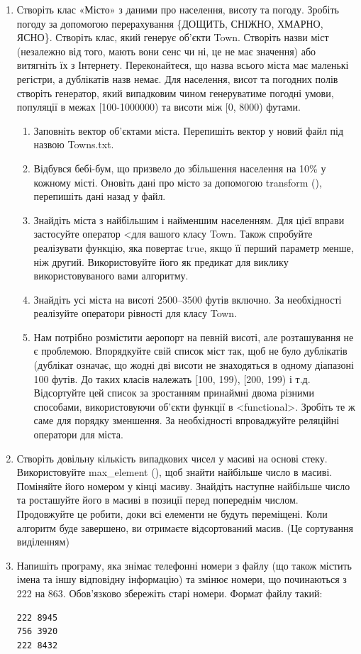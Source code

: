 \documentclass[a5paper,titlepage,openany,twoside,draft]{book_unv}%
\makeatletter
\newcommand{\xslalph}[1]{\expandafter\@xslalph\csname c@#1\endcsname}
\newcommand{\@xslalph}[1]{%
    \ifcase#1\or а\or б\or в\or г\or д\or e\or є\or ж\or з\or i%
    \or й\or к\or л\or м\or н\or о\or п\or р\or с\or т%
    \or у\or ф\or х\or ц\or ч\or ш\or ю\or я\or аа\or бб\or вв%
    \else\@ctrerr\fi%
}
\makeatother
\begin{document}
\begin{enumerate}
\item
  Створіть клас «Місто» з даними про населення, висоту та погоду.
  Зробіть погоду за допомогою перерахування \{ДОЩИТЬ, СНІЖНО, ХМАРНО,
  ЯСНО\}. Створіть клас, який генерує об'єкти Town. Створіть назви міст
  (незалежно від того, мають вони сенс чи ні, це не має значення) або
  витягніть їх з Інтернету. Переконайтеся, що назва всього міста має
  маленькі регістри, а дублікатів назв немає. Для населення, висот та погодних
  полів створіть генератор, який випадковим чином генеруватиме погодні
  умови, популяції в межах {[}100-1000000) та висоти між {[}0, 8000)
  футами. 
\begin{enumerate}[label=\xslalph*)]
\item
Заповніть вектор об'єктами міста. Перепишіть вектор у новий
  файл під назвою Towns.txt. 
 
  \item
 Відбувся бебі-бум, що призвело до збільшення населення на 10\% у кожному
місті. Оновіть дані про місто за допомогою transform (), перепишіть дані
назад у файл. 
\item
Знайдіть міста з найбільшим і найменшим населенням. Для цієї вправи
  застосуйте оператор \textless{}для вашого класу Town. Також спробуйте
  реалізувати функцію, яка повертає true, якщо її перший параметр менше,
  ніж другий. Використовуйте його як предикат для виклику
  використовуваного вами алгоритму.
 \item
Знайдіть усі міста на висоті 2500--3500 футів включно. За необхідності
реалізуйте оператори рівності для класу Town.
 \item
  Нам потрібно розмістити аеропорт на певній висоті, але розташування не
  є проблемою. Впорядкуйте свій список міст так, щоб не було дублікатів
  (дублікат означає, що жодні дві висоти не знаходяться в одному
  діапазоні 100 футів. До таких класів належать {[}100, 199), {[}200,
  199) і т.д. Відсортуйте цей список за зростанням принаймні двома
  різними способами, використовуючи об'єкти функції в
  \textless{}functional\textgreater{}. Зробіть те ж саме для порядку
  зменшення. За необхідності впроваджуйте реляційні оператори для міста.
\end{enumerate}

\item
  Створіть довільну кількість випадкових чисел у масиві на основі стеку.
  Використовуйте max\_element (), щоб знайти найбільше число в масиві.
  Поміняйте його номером у кінці масиву. Знайдіть наступне найбільше
  число та росташуйте його в масиві в позиції перед попереднім числом.
  Продовжуйте це робити, доки всі елементи не будуть переміщені. Коли
  алгоритм буде завершено, ви отримаєте відсортований масив. (Це
  сортування виділенням)
\item
  Напишіть програму, яка знімає телефонні номери з файлу (що також
  містить імена та іншу відповідну інформацію) та змінює номери, що
  починаються з 222 на 863. Обов'язково збережіть старі номери. Формат
  файлу такий:
\begin{verbatim}
222 8945
756 3920
222 8432
\end{verbatim}


\end{enumerate}
\end{document}

